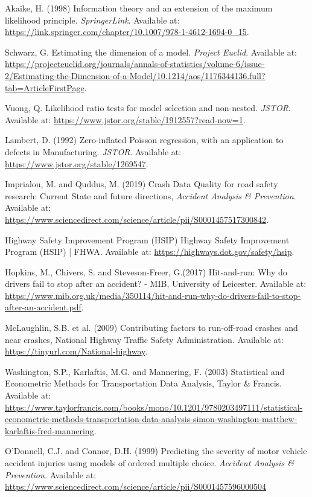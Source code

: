 \documentclass[12]{report}
\begin{document}
\begin{thebibliography}{9}
Akaike, H. (1998) Information theory and an extension of the maximum likelihood principle. \textit{SpringerLink}. Available at: \url{https://link.springer.com/chapter/10.1007/978-1-4612-1694-0_15}.

Schwarz, G. Estimating the dimension of a model. \textit{Project Euclid}. Available at: \url{https://projecteuclid.org/journals/annals-of-statistics/volume-6/issue-2/Estimating-the-Dimension-of-a-Model/10.1214/aos/1176344136.full?tab=ArticleFirstPage}.

Vuong, Q. Likelihood ratio tests for model selection and non-nested. \textit{JSTOR}. Available at: \url{https://www.jstor.org/stable/1912557?read-now=1}.

Lambert, D. (1992) Zero-inflated Poisson regression, with an application to defects in Manufacturing. \textit{JSTOR}. Available at: \url{https://www.jstor.org/stable/1269547}.

Imprialou, M. and Quddus, M. (2019) Crash Data Quality for road safety research: Current State and future directions, \textit{Accident Analysis \& Prevention}. Available at: \url{https://www.sciencedirect.com/science/article/pii/S0001457517300842}.

Highway Safety Improvement Program (HSIP) Highway Safety Improvement Program (HSIP) | FHWA. Available at: \url{https://highways.dot.gov/safety/hsip}.

Hopkins, M., Chivers, S. and Steveson-Freer, G.(2017) Hit-and-run: Why do drivers fail to stop after an accident? - MIB, University of Leicester. Available at: \url{https://www.mib.org.uk/media/350114/hit-and-run-why-do-drivers-fail-to-stop-after-an-accident.pdf}.

McLaughlin, S.B. et al. (2009) Contributing factors to run-off-road crashes and near crashes, National Highway Traffic Safety Administration. Available at: \url{https://tinyurl.com/National-highway}.


Washington, S.P., Karlaftis, M.G. and Mannering, F. (2003) Statistical and Econometric Methods for Transportation Data Analysis, Taylor \& Francis. Available at: \url{https://www.taylorfrancis.com/books/mono/10.1201/9780203497111/statistical-econometric-methods-transportation-data-analysis-simon-washington-matthew-karlaftis-fred-mannering}.

O'Donnell, C.J. and Connor, D.H. (1999) Predicting the severity of motor vehicle accident injuries using models of ordered multiple choice. \textit{Accident Analysis \& Prevention.} Available at: \url{https://www.sciencedirect.com/science/article/pii/S0001457596000504}


\end{thebibliography}
\end{document}
